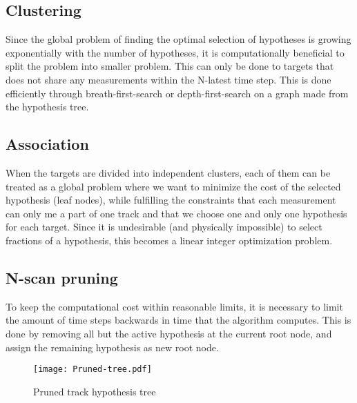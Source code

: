 \subsection{Clustering}
Since the global problem of finding the optimal selection of hypotheses is growing exponentially with the number of hypotheses, it is computationally beneficial to split the problem into smaller problem. This can only be done to targets that does not share any measurements within the N-latest time step. This is done efficiently through breath-first-search or depth-first-search on a graph made from the hypothesis tree.

\subsection{Association}
When the targets are divided into independent clusters, each of them can be treated as a global problem where we want to minimize the cost of the selected hypothesis (leaf nodes), while fulfilling the constraints that each measurement can only me a part of one track and that we choose one and only one hypothesis for each target. Since it is undesirable (and physically impossible) to select fractions of a hypothesis, this becomes a linear integer optimization problem.

\subsection{N-scan pruning}
To keep the computational cost within reasonable limits, it is necessary to limit the amount of time steps backwards in time that the algorithm computes. This is done by removing all but the active hypothesis at the current root node, and assign the remaining hypothesis as new root node. 

\begin{figure}[ht]
\centering
\texttt{[image: Pruned-tree.pdf]}
\caption{Pruned track hypothesis tree}
\label{fig:pruned-hyp-tree}
\end{figure}